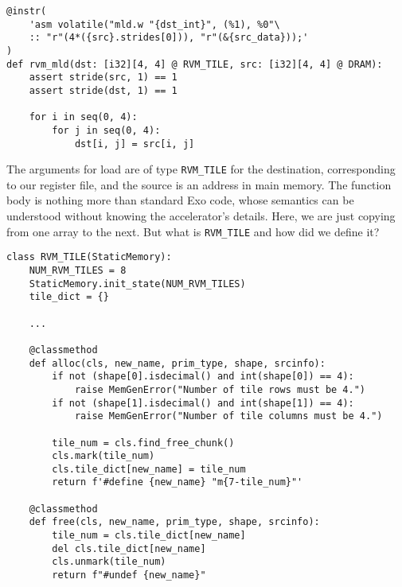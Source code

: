 \documentclass[acmsmall, nonacm=true]{acmart}
\begin{document}
\begin{verbatim}
@instr(
    'asm volatile("mld.w "{dst_int}", (%1), %0"\
    :: "r"(4*({src}.strides[0])), "r"(&{src_data}));'
)
def rvm_mld(dst: [i32][4, 4] @ RVM_TILE, src: [i32][4, 4] @ DRAM):
    assert stride(src, 1) == 1
    assert stride(dst, 1) == 1

    for i in seq(0, 4):
        for j in seq(0, 4):
            dst[i, j] = src[i, j]
\end{verbatim}

The arguments for load are of type \verb|RVM_TILE| for the destination, corresponding to our register file, and the source is an address in main memory. The function body is nothing more than standard Exo code, whose semantics can be understood without knowing the accelerator's details. Here, we are just copying from one array to the next. But what is \verb|RVM_TILE| and how did we define it? 

\begin{verbatim}
class RVM_TILE(StaticMemory):
    NUM_RVM_TILES = 8
    StaticMemory.init_state(NUM_RVM_TILES)
    tile_dict = {}

    ...

    @classmethod
    def alloc(cls, new_name, prim_type, shape, srcinfo):
        if not (shape[0].isdecimal() and int(shape[0]) == 4):
            raise MemGenError("Number of tile rows must be 4.")
        if not (shape[1].isdecimal() and int(shape[1]) == 4):
            raise MemGenError("Number of tile columns must be 4.")

        tile_num = cls.find_free_chunk()
        cls.mark(tile_num)
        cls.tile_dict[new_name] = tile_num
        return f'#define {new_name} "m{7-tile_num}"'

    @classmethod
    def free(cls, new_name, prim_type, shape, srcinfo):
        tile_num = cls.tile_dict[new_name]
        del cls.tile_dict[new_name]
        cls.unmark(tile_num)
        return f"#undef {new_name}"

\end{verbatim}
\end{document}
